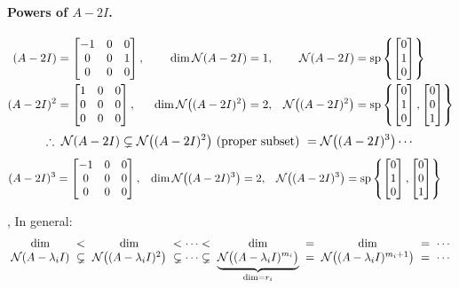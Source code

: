 \begin{example}
\paragraph{Powers of $A-2I$.}
\begin{align*}
(A-2I)&=\begin{bmatrix}-1&0&0\\0&0&1\\0&0&0\end{bmatrix}, & \dim\mathcal{N}(A-2I)&=1, & \mathcal{N}(A-2I)&=\operatorname{sp}\left\{\begin{bmatrix}0\\1\\0\end{bmatrix}\right\}\\
(A-2I)^2&=\begin{bmatrix}1&0&0\\0&0&0\\0&0&0\end{bmatrix}, & \dim\mathcal{N}\big((A-2I)^2\big)&=2, & \mathcal{N}\big((A-2I)^2\big)&=\operatorname{sp}\left\{\begin{bmatrix}0\\1\\0\end{bmatrix},\begin{bmatrix}0\\0\\1\end{bmatrix}\right\}
\end{align*}
\[
\therefore\;\Null(A-2I)\subsetneq\Null\big((A-2I)^2\big)\ \text{(proper subset)}\ =\Null\big((A-2I)^3\big)\cdots
\]
\begin{align*}
(A-2I)^3&=\begin{bmatrix}-1&0&0\\0&0&0\\0&0&0\end{bmatrix}, & \dim\mathcal{N}\big((A-2I)^3\big)&=2, & \mathcal{N}\big((A-2I)^3\big)&=\operatorname{sp}\left\{\begin{bmatrix}0\\1\\0\end{bmatrix},\begin{bmatrix}0\\0\\1\end{bmatrix}\right\}
\end{align*}

\sep
In general:
\[\setlength{\arraycolsep}{3pt}
\begin{array}{ccccccccc}
\dim & < & \dim & < \cdots < & \dim & = & \dim & = & \cdots\\
\Null(A-\lambda_iI) & \subsetneq & \Null\big((A-\lambda_iI)^2\big) & \subsetneq\cdots\subsetneq & \underbrace{\Null\big((A-\lambda_iI)^{m_i}\big)}_{\dim=r_i} & = & \Null\big((A-\lambda_iI)^{m_i+1}\big) & = & \cdots
\end{array}
\]
\end{example}


